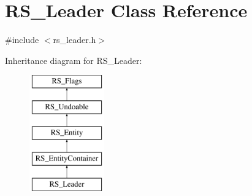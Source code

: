 \hypertarget{classRS__Leader}{\section{R\-S\-\_\-\-Leader Class Reference}
\label{classRS__Leader}
}


{\ttfamily \#include $<$rs\-\_\-leader.\-h$>$}

Inheritance diagram for R\-S\-\_\-\-Leader\-:\begin{figure}[H]
\begin{center}
\leavevmode
\includegraphics[height=5.000000cm]{classRS__Leader}
\end{center}
\end{figure}
